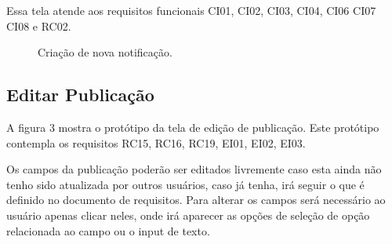 \documentclass[12pt]{article}
\begin{document}
Essa tela atende aos requisitos funcionais CI01, CI02, CI03, CI04, CI06 CI07 CI08 e RC02.




\begin{figure}[h!]
  \caption{Criação de nova notificação.}
  \label{fig:newnot}
\end{figure}

\vfill%
\pagebreak%


\subsection{Editar Publicação}\label{subsec:SeceditInci}

A figura 3 mostra o protótipo da tela de edição de publicação. Este protótipo contempla os requisitos RC15, RC16, RC19, EI01, EI02, EI03.

Os campos da publicação poderão ser editados livremente caso esta ainda não tenho sido atualizada por outros usuários, caso já tenha, irá seguir o que é definido no documento de requisitos. Para alterar os campos será necessário ao usuário apenas clicar neles, onde irá aparecer as opções de seleção de opção relacionada ao campo ou o input de texto. 
\end{document}
